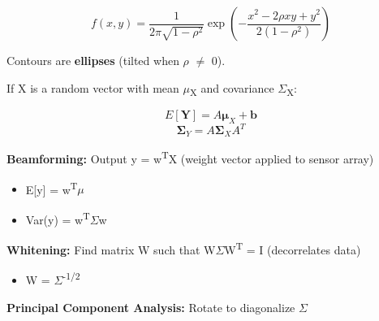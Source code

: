 \[f(x,y) = \frac{1}{2\pi\sqrt{1-\rho^2}} \exp\left(-\frac{x^2 - 2\rho xy + y^2}{2(1-\rho^2)}\right)\]

Contours are \textbf{ellipses} (tilted when \ensuremath{\rho} \ensuremath{\neq} 0).



If X is a random vector with mean \ensuremath{\mu}\textsubscript{X} and covariance \ensuremath{\Sigma}\textsubscript{X}:

\[E[\mathbf{Y}] = A\boldsymbol{\mu}_X + \mathbf{b}\]\PSbr{}\[\boldsymbol{\Sigma}_Y = A\boldsymbol{\Sigma}_X A^T\]


\textbf{Beamforming:} Output y = w\textsuperscript{T}X (weight vector applied to sensor array)

\begin{itemize}
\tightlist
\item
  E[y] = w\textsuperscript{T}\ensuremath{\mu}
\item
  Var(y) = w\textsuperscript{T}\ensuremath{\Sigma}w
\end{itemize}

\textbf{Whitening:} Find matrix W such that W\ensuremath{\Sigma}W\textsuperscript{T} = I (decorrelates data)

\begin{itemize}
\tightlist
\item
  W = \ensuremath{\Sigma}\textsuperscript{-1/2}
\end{itemize}

\textbf{Principal Component Analysis:} Rotate to diagonalize \ensuremath{\Sigma}


